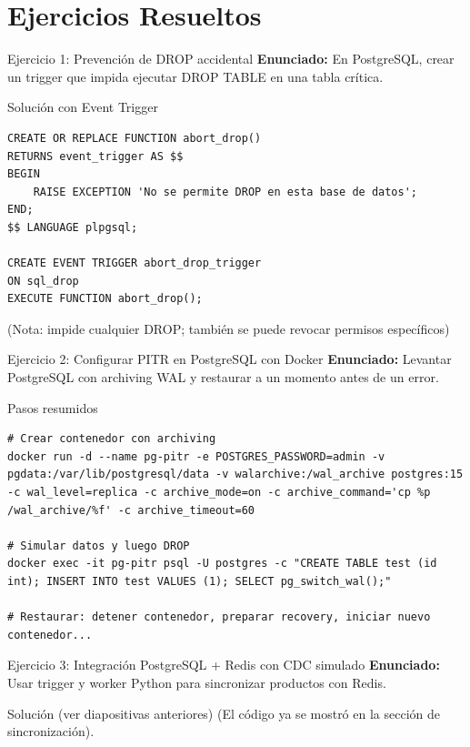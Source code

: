 \documentclass[aspectratio=169, 10pt, xcolor=table]{beamer}
\begin{document}
\section{Ejercicios Resueltos}

\begin{frame}[fragile]{Ejercicio 1: Prevención de DROP accidental}
    \textbf{Enunciado:} En PostgreSQL, crear un trigger que impida ejecutar DROP TABLE en una tabla crítica.
    \begin{block}{Solución con Event Trigger}
        \begin{lstlisting}[style=sqlstyle]
CREATE OR REPLACE FUNCTION abort_drop()
RETURNS event_trigger AS $$
BEGIN
    RAISE EXCEPTION 'No se permite DROP en esta base de datos';
END;
$$ LANGUAGE plpgsql;

CREATE EVENT TRIGGER abort_drop_trigger
ON sql_drop
EXECUTE FUNCTION abort_drop();
        \end{lstlisting}
        (Nota: impide cualquier DROP; también se puede revocar permisos específicos)
    \end{block}
\end{frame}

\begin{frame}[fragile]{Ejercicio 2: Configurar PITR en PostgreSQL con Docker}
    \textbf{Enunciado:} Levantar PostgreSQL con archiving WAL y restaurar a un momento antes de un error.
    \begin{block}{Pasos resumidos}
        \begin{lstlisting}[style=bashstyle]
# Crear contenedor con archiving
docker run -d --name pg-pitr -e POSTGRES_PASSWORD=admin -v pgdata:/var/lib/postgresql/data -v walarchive:/wal_archive postgres:15 -c wal_level=replica -c archive_mode=on -c archive_command='cp %p /wal_archive/%f' -c archive_timeout=60

# Simular datos y luego DROP
docker exec -it pg-pitr psql -U postgres -c "CREATE TABLE test (id int); INSERT INTO test VALUES (1); SELECT pg_switch_wal();"

# Restaurar: detener contenedor, preparar recovery, iniciar nuevo contenedor...
        \end{lstlisting}
    \end{block}
\end{frame}

\begin{frame}[fragile]{Ejercicio 3: Integración PostgreSQL + Redis con CDC simulado}
    \textbf{Enunciado:} Usar trigger y worker Python para sincronizar productos con Redis.
    \begin{block}{Solución (ver diapositivas anteriores)}
        (El código ya se mostró en la sección de sincronización).
    \end{block}
\end{frame}
\end{document}
